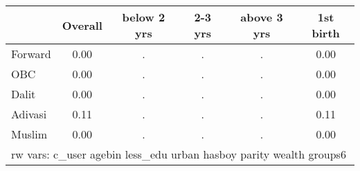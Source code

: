 \begin{tabular}{l*{5}{c}}
\toprule
            &\multicolumn{1}{c}{Overall}&\multicolumn{1}{c}{below 2 yrs}&\multicolumn{1}{c}{2-3 yrs}&\multicolumn{1}{c}{above 3 yrs}&\multicolumn{1}{c}{1st birth}\\
\midrule
\midrule
Forward     &        0.00&           .&           .&           .&        0.00\\
OBC         &        0.00&           .&           .&           .&        0.00\\
Dalit       &        0.00&           .&           .&           .&        0.00\\
Adivasi     &        0.11&           .&           .&           .&        0.11\\
Muslim      &        0.00&           .&           .&           .&        0.00\\
\bottomrule
\multicolumn{6}{l}{\footnotesize rw vars: c\_user agebin less\_edu urban hasboy parity wealth groups6}\\
\end{tabular}

